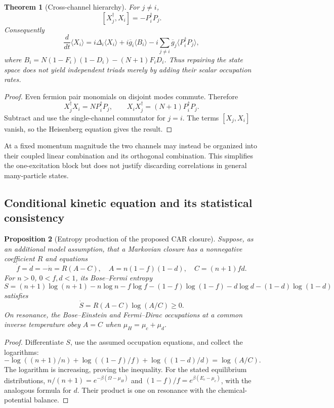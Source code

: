 \documentclass[11pt]{article}
\newtheorem{theorem}{Theorem}[section]
\newtheorem{proposition}[theorem]{Proposition}
\theoremstyle{remark}
\begin{document}
\begin{theorem}[Cross-channel hierarchy]
\label{thm:v20v44-cross}
For \(j\neq i\),
\[
 [X_j^\dagger,X_i]=-P_i^\dagger P_j.
\]
Consequently
\[
 \frac{d}{dt}\langle X_i\rangle
 =i\Delta_i\langle X_i\rangle+
 i\overline g_i\langle B_i\rangle
 -i\sum_{j\neq i}\overline g_j\langle P_i^\dagger P_j\rangle,
\]
where \(B_i=N(1-F_i)(1-D_i)-(N+1)F_iD_i\).
Thus repairing the state space does not yield independent triads
merely by adding their scalar occupation rates.
\end{theorem}
\begin{proof}
Even fermion pair monomials on disjoint modes commute.  Therefore
\[
 X_j^\dagger X_i=NP_i^\dagger P_j,\qquad
 X_iX_j^\dagger=(N+1)P_i^\dagger P_j.
\]
Subtract and use the single-channel commutator for \(j=i\).
The terms \([X_j,X_i]\) vanish, so the Heisenberg equation gives
the result.
\end{proof}

At a fixed momentum magnitude the two channels may instead be
organized into their coupled linear combination and its orthogonal
combination.  This simplifies the one-excitation block but does not
justify discarding correlations in general many-particle states.

\subsection{Conditional kinetic equation and its statistical consistency}

\begin{proposition}[Entropy production of the proposed CAR closure]
\label{prop:v20v44-entropy}
Suppose, as an additional model assumption, that a Markovian closure
has a nonnegative coefficient \(R\) and equations
\[
 \dot f=\dot d=-\dot n=R(A-C),\quad
 A=n(1-f)(1-d),\quad C=(n+1)fd.
\]
For \(n>0\), \(0<f,d<1\), its Bose--Fermi entropy
\[
 S=(n+1)\log(n+1)-n\log n
   -f\log f-(1-f)\log(1-f)
   -d\log d-(1-d)\log(1-d)
\]
satisfies
\[
 \dot S=R(A-C)\log(A/C)\geq0.
\]
On resonance, the Bose--Einstein and Fermi--Dirac occupations
at a common inverse temperature obey \(A=C\) when
\(\mu_H=\mu_c+\mu_d\).
\end{proposition}
\begin{proof}
Differentiate \(S\), use the assumed occupation equations, and collect
the logarithms:
\[
 -\log((n+1)/n)+\log((1-f)/f)+\log((1-d)/d)=\log(A/C).
\]
The logarithm is increasing, proving the inequality.
For the stated equilibrium distributions,
\(n/(n+1)=e^{-\beta(\Omega-\mu_H)}\) and
\((1-f)/f=e^{\beta(E_c-\mu_c)}\), with the analogous formula for \(d\).
Their product is one on resonance with the chemical-potential balance.
\end{proof}
\end{document}

